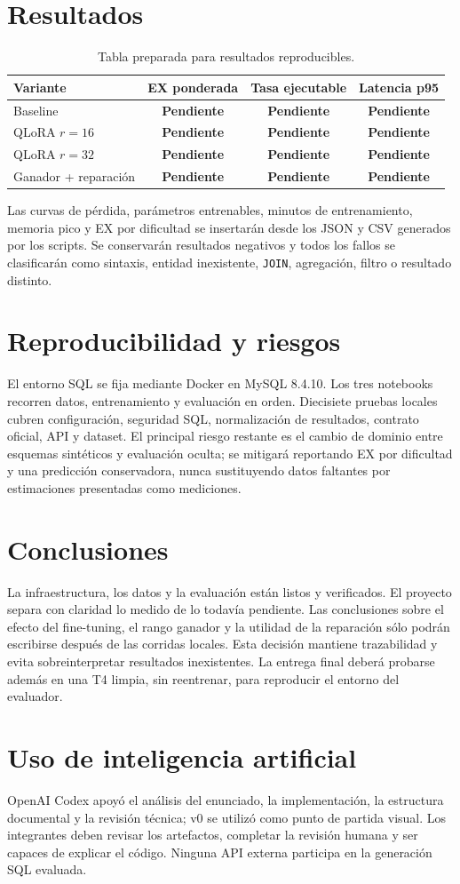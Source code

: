 \documentclass[10pt,letterpaper]{article}
\newcommand{\pendingcell}{\textcolor{rust}{\textbf{Pendiente}}}
\newcommand{\code}[1]{\texttt{#1}}
\begin{document}
\section{Resultados}
\begin{table}[H]\centering\caption{Tabla preparada para resultados reproducibles.}
\begin{tabular}{@{}lccc@{}}\toprule Variante&EX ponderada&Tasa ejecutable&Latencia p95\\\midrule Baseline&\pendingcell&\pendingcell&\pendingcell\\QLoRA $r=16$&\pendingcell&\pendingcell&\pendingcell\\QLoRA $r=32$&\pendingcell&\pendingcell&\pendingcell\\Ganador + reparación&\pendingcell&\pendingcell&\pendingcell\\\bottomrule\end{tabular}\end{table}

Las curvas de pérdida, parámetros entrenables, minutos de entrenamiento, memoria pico y EX por dificultad se insertarán desde los JSON y CSV generados por los scripts. Se conservarán resultados negativos y todos los fallos se clasificarán como sintaxis, entidad inexistente, \code{JOIN}, agregación, filtro o resultado distinto.

\section{Reproducibilidad y riesgos}
El entorno SQL se fija mediante Docker en MySQL 8.4.10. Los tres notebooks recorren datos, entrenamiento y evaluación en orden. Diecisiete pruebas locales cubren configuración, seguridad SQL, normalización de resultados, contrato oficial, API y dataset. El principal riesgo restante es el cambio de dominio entre esquemas sintéticos y evaluación oculta; se mitigará reportando EX por dificultad y una predicción conservadora, nunca sustituyendo datos faltantes por estimaciones presentadas como mediciones.

\section{Conclusiones}
La infraestructura, los datos y la evaluación están listos y verificados. El proyecto separa con claridad lo medido de lo todavía pendiente. Las conclusiones sobre el efecto del fine-tuning, el rango ganador y la utilidad de la reparación sólo podrán escribirse después de las corridas locales. Esta decisión mantiene trazabilidad y evita sobreinterpretar resultados inexistentes. La entrega final deberá probarse además en una T4 limpia, sin reentrenar, para reproducir el entorno del evaluador.

\section*{Uso de inteligencia artificial}
OpenAI Codex apoyó el análisis del enunciado, la implementación, la estructura documental y la revisión técnica; v0 se utilizó como punto de partida visual. Los integrantes deben revisar los artefactos, completar la revisión humana y ser capaces de explicar el código. Ninguna API externa participa en la generación SQL evaluada.
\end{document}
